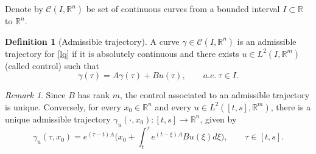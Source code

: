 \documentclass[reqno]{amsart}
\theoremstyle{plain}
\theoremstyle{definition}
\newtheorem{Def}[thm]{Definition}
\theoremstyle{remark}
\newtheorem{rem}[thm]{Remark}
\newcommand{\R}{\mathbb{R}}
\newcommand{\red}{\color{red}}
\begin{document}
      Denote by $\mathcal{C}(I,\mathbb{R}^n)$ be set of continuous curves from a bounded interval $I\subset \R$ to $\R^n$.
      \begin{Def}[Admissible trajectory] A curve $\gamma\in\mathcal{C}(I,\R^n)$ is an admissible trajectory for \eqref{lq} if it is absolutely continuous and there exists $u \in L^2\left(I,\R^m\right)$ (called control) such that
			\begin{equation}
				\dot{\gamma}(\tau)=A\gamma(\tau)+Bu(\tau),\qquad a.e.\ \tau \in I.
			\end{equation}
      \end{Def}
      
      \begin{rem}\label{bijection_trajectories_controls}
          Since $B$ has rank $m$, the control associated to an admissible trajectory is unique. Conversely, for every $x_0\in\mathbb{R}^n$ and every $u\in L^2\left(\left[t,s\right],\R^m\right)$, there is a unique admissible trajectory $\gamma_u(\cdot,x_0):\left[t,s\right]\to\mathbb{R}^n$, given by 
          \begin{equation}\label{Cauchy}
			\gamma_u(\tau,x_0)=e^{(\tau -t) A}\bigg(x_0+\int_{t}^{\tau}e^{(t-\xi) A}Bu(\xi)d\xi\bigg),\qquad \tau\in\left[t,s\right].
		\end{equation}
      \end{rem}
\end{document}
